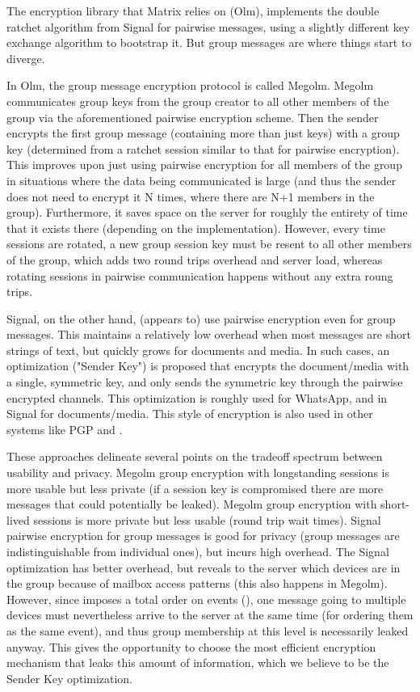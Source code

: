 
The encryption library that Matrix relies on (Olm), implements the double ratchet
algorithm from Signal for pairwise messages, using a slightly different key 
exchange algorithm to bootstrap it. But group messages are where things start to 
diverge. 

In Olm, the group message encryption protocol is called Megolm. Megolm 
communicates group keys from the group creator to all other members of the
group via the aforementioned pairwise encryption scheme. Then the sender
encrypts the first group message (containing more than just keys) with a group
key (determined from a ratchet session similar to that for pairwise encryption).
This improves upon just using pairwise encryption for all members of the group
in situations where the data being communicated is large (and thus the sender
does not need to encrypt it N times, where there are N+1 members in the group).
Furthermore, it saves space on the server for roughly the entirety of time that
it exists there (depending on the implementation).
However, every time sessions are rotated, a new group session key must be 
resent to all other members of the group, which adds two round trips overhead
and server load, whereas rotating sessions in pairwise communication happens
without any extra roung trips.

Signal, on the other hand, (appears to) use pairwise encryption even for
group messages. This maintains a relatively low overhead when most messages are
short strings of text, but quickly grows for documents and media. In such cases, 
an optimization ("Sender Key") is proposed that encrypts the document/media with 
a single, symmetric key, and only sends the symmetric key through the pairwise 
encrypted channels.  This optimization is roughly used for WhatsApp, 
and in Signal for documents/media. This style of encryption is also used in other
systems like  PGP and .

These approaches delineate several points on the tradeoff spectrum between 
usability and privacy. Megolm group encryption with longstanding sessions is
more usable but less private (if a session key is compromised there are more 
messages that could potentially be leaked). Megolm group encryption with short-
lived sessions is more private but less usable (round trip wait times). Signal
pairwise encryption for group messages is good for privacy (group messages
are indistinguishable from individual ones), but incurs high overhead. The 
Signal optimization has better overhead, but reveals to the server which devices
are in the group because of mailbox access patterns (this also happens in Megolm).
However, since \name{} imposes a total order on events (),
one message going to multiple devices must nevertheless arrive to the server at
the same time (for ordering them as the same event), and thus group membership
at this level is necessarily leaked anyway. This gives \name{} the opportunity
to choose the most efficient encryption mechanism that leaks this amount of 
information, which we believe to be the Sender Key optimization.


